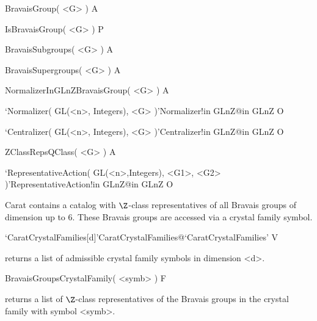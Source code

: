 \>BravaisGroup( <G> ) A

\>IsBravaisGroup( <G> ) P

\>BravaisSubgroups( <G> ) A

\>BravaisSupergroups( <G> ) A

\>NormalizerInGLnZBravaisGroup( <G> ) A

\>`Normalizer( GL(<n>, Integers), <G> )'{Normalizer!in GLnZ}@{in GLnZ} O

\>`Centralizer( GL(<n>, Integers), <G> )'{Centralizer!in GLnZ}@{in GLnZ} O

\>ZClassRepsQClass( <G> ) A

\>`RepresentativeAction( GL(<n>,Integers), <G1>, <G2> )'{RepresentativeAction!in GLnZ}@{in GLnZ} O



Carat contains a catalog with $\Z$-class representatives of all
Bravais groups of dimension up to 6. These Bravais groups are
accessed via a crystal family symbol.

\>`CaratCrystalFamilies[d]'{CaratCrystalFamilies}@{`CaratCrystalFamilies'} V

returns a list of admissible crystal family symbols in dimension <d>.

\>BravaisGroupsCrystalFamily( <symb> ) F

returns a list of $\Z$-class representatives of the Bravais groups
in the crystal family with symbol <symb>.


